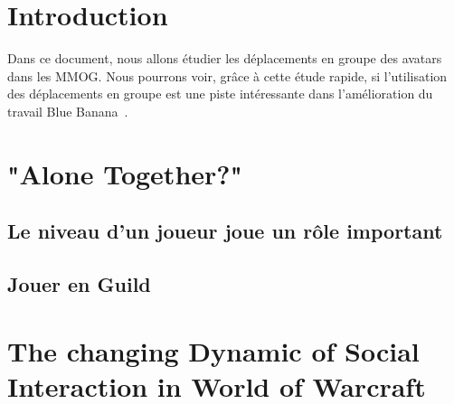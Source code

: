 \documentclass[11pt,a4paper]{article}
\begin{document}

\newpage
\tableofcontents
\newpage



\section{Introduction}
Dans ce document, nous allons étudier les déplacements en groupe des avatars dans les MMOG. Nous pourrons voir, grâce à cette étude rapide, si l'utilisation des déplacements en groupe est une piste intéressante dans l'amélioration du travail Blue Banana~\cite{191}.

\newpage
\section{"Alone Together?"}
\subsection{Le niveau d'un joueur joue un rôle important}

\subsection{Jouer en Guild}

\section{The changing Dynamic of Social Interaction in World of Warcraft}



\newpage




 
\end{document}
